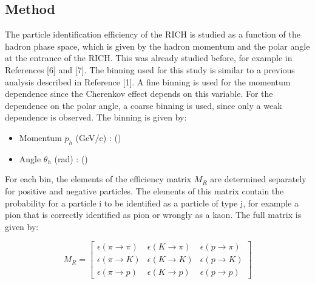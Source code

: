 \subsection{Method}

The particle identification efficiency of the RICH is studied as a function of the hadron phase space, which is given by the hadron momentum and the polar angle at the
entrance of the RICH. This was already studied before, for example in References [6] and [7]. The binning used for this study is similar to a previous analysis described
in Reference [1]. A fine binning is used for the momentum dependence since the Cherenkov effect depends on this variable. For the dependence on the polar angle, a coarse
binning is used, since only a weak dependence is observed. The binning is given by:

\begin{itemize}
  \item Momentum $p_h$ (GeV/c) : ()
  \item Angle $\theta_h$ (rad) : ()
\end{itemize}

For each bin, the elements of the efficiency matrix $M_R$ are determined separately for positive and negative particles. The elements of this matrix contain the probability
for a particle i to be identified as a particle of type j, for example a pion that is correctly identified as pion or wrongly as a kaon. The full matrix is given by:

\begin{equation}
  M_R
  =
  \begin{bmatrix}
  \epsilon(\pi \rightarrow \pi) & \epsilon(K \rightarrow \pi) & \epsilon(p \rightarrow \pi)\\
  \epsilon(\pi \rightarrow K) & \epsilon(K \rightarrow K) & \epsilon(p \rightarrow K) \\
  \epsilon(\pi \rightarrow p) & \epsilon(K \rightarrow p) & \epsilon(p \rightarrow p)
  \end{bmatrix}
\end{equation}

